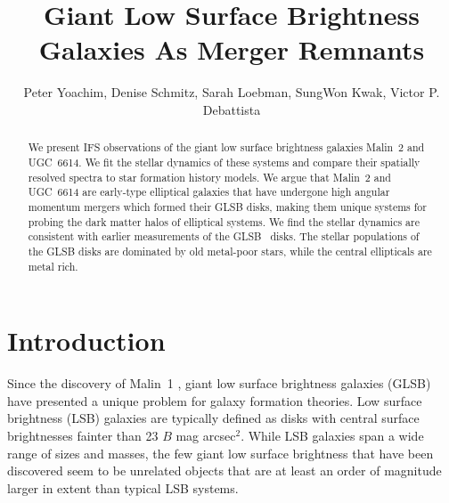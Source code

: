 \documentclass[12pt,preprint]{aastex}
\newcommand\HI{\ion{H}{1}}
\begin{document}
\title{Giant Low Surface Brightness Galaxies As Merger Remnants}


\author{Peter Yoachim, Denise Schmitz, Sarah Loebman, SungWon Kwak, Victor P. Debattista
  }


\begin{abstract}
We present IFS observations of the giant low surface brightness galaxies Malin~2 and UGC~6614.
We fit the stellar dynamics of these systems and compare their spatially resolved spectra to star formation history models.
We argue that Malin~2 and UGC~6614 are early-type elliptical galaxies that have undergone high angular momentum mergers which formed their GLSB disks, making them unique systems for probing the dark matter halos of elliptical systems.
We find the stellar dynamics are consistent with earlier measurements of the GLSB \HI\ disks.
The stellar populations of the GLSB disks are dominated by old metal-poor stars, while the central ellipticals are metal rich.

\end{abstract}


\section{Introduction}

Since the discovery of Malin~1 \citep{Bothun87}, giant low surface brightness galaxies (GLSB) have presented a unique problem for galaxy formation theories.
Low surface brightness (LSB) galaxies are typically defined as disks with central surface brightnesses fainter than 23 $B$ mag arcsec$^2$.
While LSB galaxies span a wide range of sizes and masses, the few giant low surface brightness that have been discovered seem to be unrelated objects that are at least an order of magnitude larger in extent than typical LSB systems. 
\end{document}
